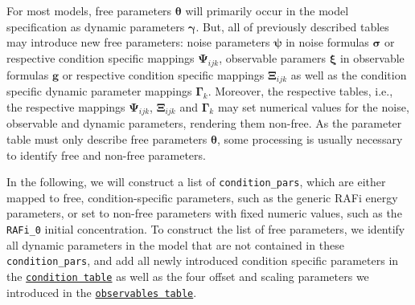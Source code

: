 \documentclass[11pt]{article}
\begin{document}
For most models, free parameters \(\boldsymbol{\theta}\) will primarily
occur in the model specification as dynamic parameters
\(\boldsymbol{\gamma}\). But, all of previously described tables may
introduce new free parameters: noise parameters \(\boldsymbol{\psi}\) in
noise formulas \(\boldsymbol{\sigma}\) or respective condition specific
mappings \(\boldsymbol{\Psi}_{ijk}\), observable paramers
\(\boldsymbol{\xi}\) in observable formulas \(\boldsymbol{g}\) or
respective condition specific mappings \(\boldsymbol{\Xi}_{ijk}\) as
well as the condition specific dynamic parameter mappings
\(\boldsymbol{\Gamma}_{k}\). Moreover, the respective tables, i.e., the
respective mappings \(\boldsymbol{\Psi}_{ijk}\),
\(\boldsymbol{\Xi}_{ijk}\) and \(\boldsymbol{\Gamma}_{k}\) may set
numerical values for the noise, observable and dynamic parameters,
rendering them non-free. As the parameter table must only describe free
parameters \(\boldsymbol{\theta}\), some processing is usually necessary
to identify free and non-free parameters.

In the following, we will construct a list of \texttt{condition\_pars},
which are either mapped to free, condition-specific parameters, such as
the generic RAFi energy parameters, or set to non-free parameters with
fixed numeric values, such as the \texttt{RAFi\_0} initial
concentration. To construct the list of free parameters, we identify all
dynamic parameters in the model that are not contained in these
\texttt{condition\_pars}, and add all newly introduced condition
specific parameters in the
\href{https://petab.readthedocs.io/en/latest/documentation_data_format.html\#condition-table}{\texttt{condition\ table}}
as well as the four offset and scaling parameters we introduced in the
\href{https://petab.readthedocs.io/en/latest/documentation_data_format.html\#observables-table}{\texttt{observables\ table}}.
\end{document}
